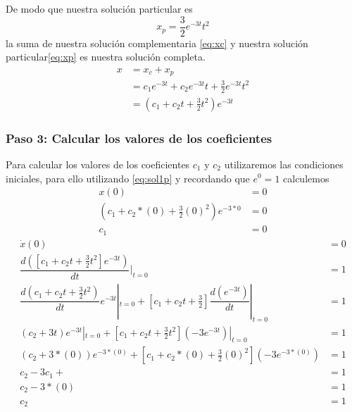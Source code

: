         De modo que nuestra solución particular es 
        \begin{equation}
            x_p = \frac{3}{2}e^{-3t}t^2
            \label{eq:xp}
        \end{equation}
        la suma de nuestra solución complementaria \eqref{eq:xc} y nuestra solución particular\eqref{eq:xp} es nuestra solución completa.
        \begin{equation}
            \begin{split}
                x & = x_c + x_p \\ 
                & = c_1 e^{-3 t} + c_2 e^{-3 t} t + \frac{3}{2}e^{-3t}t^2 \\
                & = (c_1 + c_2 t + \frac{3}{2} t^2)e^{-3t}
            \end{split}
            \label{eq:sol1p}
        \end{equation}
    \subsubsection*{Paso 3: Calcular los valores de los coeficientes}
        Para calcular los valores de los coeficientes $c_1$ y $c_2$ utilizaremos las condiciones iniciales, para ello utilizando
        \eqref{eq:sol1p} y recordando que $e^0 = 1$ calculemos
        \begin{equation}
            \begin{split}
                x(0) & = 0 \\
                (c_1 + c_2 * (0) + \frac{3}{2}(0)^2)e^{-3*0} & = 0\\
                c_1 & = 0
            \end{split}
            \label{eq:c1}
        \end{equation}
        \begin{equation}
            \begin{split}
                \dot{x}(0) & = 0 \\
                \dfrac{d([c_1 + c_2 t + \frac{3}{2} t^2]e^{-3t})}{dt}|_{t=0} & = 1\\
                \dfrac{d(c_1 + c_2 t + \frac{3}{2}t^2)}{dt}e^{-3t}|_{t=0} + [c_1 + c_2 t + \frac{3}{2}]\dfrac{d(e^{-3t})}{dt}|_{t=0} & = 1 \\
                (c_2 + 3t)e^{-3t}|_{t=0} + [c_1 + c_2 t + \frac{3}{2}t^2](-3e^{-3t})|_{t=0} & = 1 \\
                (c_2 + 3*(0))e^{-3*(0)} + [c_1 + c_2*(0) + \frac{3}{2}(0)^2](-3e^{-3*(0)}) & = 1 \\
                c_2 - 3c_1 +  & = 1\\
                c_2 - 3*(0) & = 1\\
                c_2 & = 1
            \end{split}
            \label{eq:c2}
        \end{equation}
